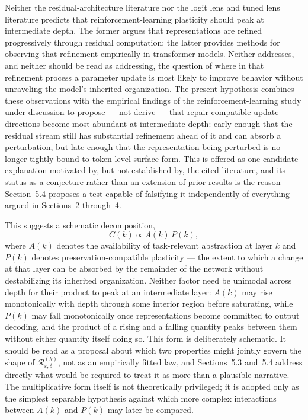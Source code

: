 \documentclass[11pt]{article}
\begin{document}
Neither the residual-architecture literature nor the logit lens and tuned lens literature predicts that reinforcement-learning plasticity should peak at intermediate depth. The former argues that representations are refined progressively through residual computation; the latter provides methods for observing that refinement empirically in transformer models. Neither addresses, and neither should be read as addressing, the question of where in that refinement process a parameter update is most likely to improve behavior without unraveling the model's inherited organization. The present hypothesis combines these observations with the empirical findings of the reinforcement-learning study under discussion to propose --- not derive --- that repair-compatible update directions become most abundant at intermediate depth: early enough that the residual stream still has substantial refinement ahead of it and can absorb a perturbation, but late enough that the representation being perturbed is no longer tightly bound to token-level surface form. This is offered as one candidate explanation motivated by, but not established by, the cited literature, and its status as a conjecture rather than an extension of prior results is the reason Section~5.4 proposes a test capable of falsifying it independently of everything argued in Sections~2 through~4.

This suggests a schematic decomposition,
\[
C(k) \propto A(k)\, P(k),
\]
where $A(k)$ denotes the availability of task-relevant abstraction at layer $k$ and $P(k)$ denotes preservation-compatible plasticity --- the extent to which a change at that layer can be absorbed by the remainder of the network without destabilizing its inherited organization. Neither factor need be unimodal across depth for their product to peak at an intermediate layer: $A(k)$ may rise monotonically with depth through some interior region before saturating, while $P(k)$ may fall monotonically once representations become committed to output decoding, and the product of a rising and a falling quantity peaks between them without either quantity itself doing so. This form is deliberately schematic. It should be read as a proposal about which two properties might jointly govern the shape of $\mathcal{R}^{(k)}_{\varepsilon,\delta}$, not as an empirically fitted law, and Sections~5.3 and~5.4 address directly what would be required to treat it as more than a plausible narrative. The multiplicative form itself is not theoretically privileged; it is adopted only as the simplest separable hypothesis against which more complex interactions between $A(k)$ and $P(k)$ may later be compared.
\end{document}
